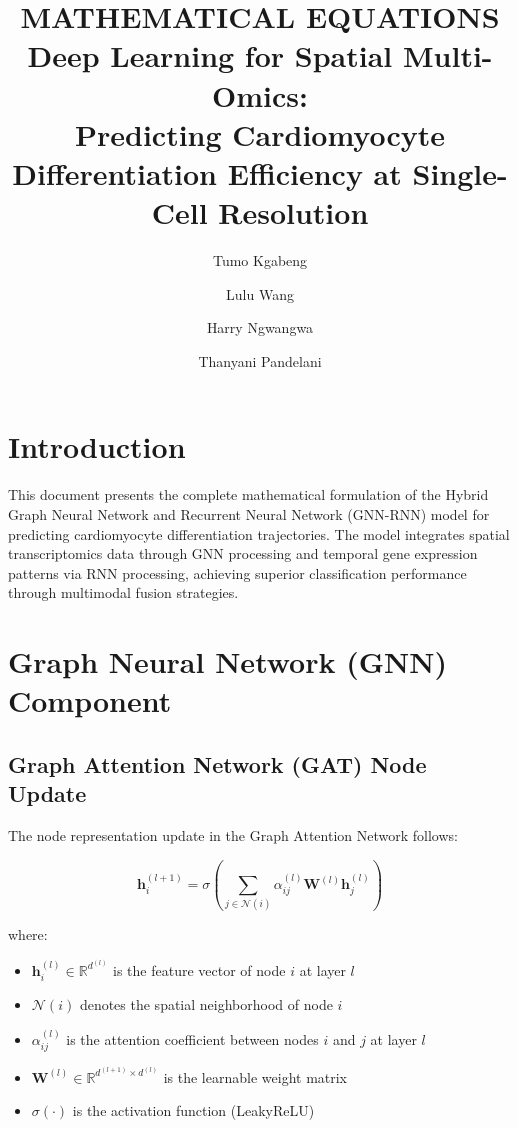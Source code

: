 \documentclass[12pt]{article}
\title{MATHEMATICAL EQUATIONS \\
\large{Deep Learning for Spatial Multi-Omics:} \\
\large{Predicting Cardiomyocyte Differentiation Efficiency at Single-Cell Resolution} \\
\large{}}
\author{Tumo Kgabeng \and Lulu Wang \and Harry Ngwangwa \and Thanyani Pandelani}
\date{}  %
\newcommand{\Real}{\mathbb{R}}
\newcommand{\vecbf}[1]{\mathbf{#1}}
\begin{document}
\maketitle

\tableofcontents
\newpage

\section{Introduction}

This document presents the complete mathematical formulation of the Hybrid Graph Neural Network and Recurrent Neural Network (GNN-RNN) model for predicting cardiomyocyte differentiation trajectories. The model integrates spatial transcriptomics data through GNN processing and temporal gene expression patterns via RNN processing, achieving superior classification performance through multimodal fusion strategies.

\section{Graph Neural Network (GNN) Component}

\subsection{Graph Attention Network (GAT) Node Update}

The node representation update in the Graph Attention Network follows:

\begin{equation}
\vecbf{h}_i^{(l+1)} = \sigma\left(\sum_{j \in \mathcal{N}(i)} \alpha_{ij}^{(l)} \vecbf{W}^{(l)} \vecbf{h}_j^{(l)}\right)
\end{equation}

where:
\begin{itemize}
    \item $\vecbf{h}_i^{(l)} \in \Real^{d^{(l)}}$ is the feature vector of node $i$ at layer $l$
    \item $\mathcal{N}(i)$ denotes the spatial neighborhood of node $i$
    \item $\alpha_{ij}^{(l)}$ is the attention coefficient between nodes $i$ and $j$ at layer $l$
    \item $\vecbf{W}^{(l)} \in \Real^{d^{(l+1)} \times d^{(l)}}$ is the learnable weight matrix
    \item $\sigma(\cdot)$ is the activation function (LeakyReLU)
\end{itemize}
\end{document}
